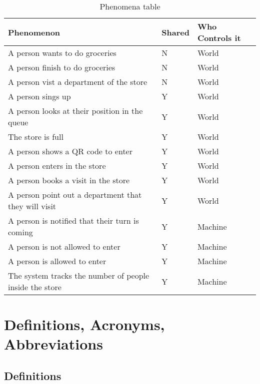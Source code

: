 \begin{table}[H]
\centering
\begin{tabular}{| m{} | m{} | m{} |} 
	\hline
	 \textbf{Phenomenon} & \textbf{Shared} &  \textbf{Who Controls it} \\
	\hline
	A person wants to do groceries &  N & World \\ 
	\hline
	A person finish to do groceries  & N &  World \\ 
	\hline
	A person vist a department of the store & N & World \\
	\hline
	A person sings up & Y & World \\ 
	\hline
	A person looks at their position in the queue & Y & World \\ 
	\hline
	The store is full & Y & World \\ 
	\hline
	A person shows a QR code to enter & Y & World \\ 
	\hline
	A person enters in the store & Y & World \\ 
	\hline
	A person books a visit in the store & Y & World \\ 
	\hline
	A person point out a department that they will visit & Y & World \\ 
	\hline
	A person is notified that their turn is coming & Y & Machine \\ 
	\hline
	A person is not allowed to enter & Y & Machine \\
	\hline
	A person is  allowed to enter & Y & Machine \\
	\hline
	The system tracks the number of people inside the store & Y & Machine \\
	\hline
\end{tabular}
\caption{Phenomena table}
\label{tablePhenomenatable}
\end{table}

\section{Definitions, Acronyms, Abbreviations}

\subsection{Definitions}

